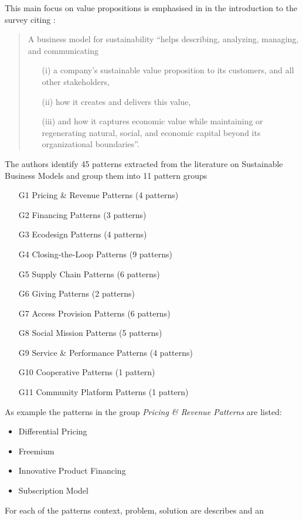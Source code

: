 \documentclass[11pt,a4paper]{article}
\begin{document}
This main focus on value propositions is emphasised in \cite{LF2018} in the
introduction to the survey citing \cite{Schaltegger2016}:
\begin{quote}
  A business model for sustainability “helps describing, analyzing, managing,
  and communicating
  \begin{itemize}
  \item[(i)] a company’s sustainable value proposition to its customers, and
    all other stakeholders,
  \item[(ii)] how it creates and delivers this value,
  \item[(iii)] and how it captures economic value while maintaining or
    regenerating natural, social, and economic capital beyond its
    organizational boundaries”.
  \end{itemize}
\end{quote}
The authors identify 45 patterns extracted from the literature on Sustainable
Business Models and group them into 11 pattern groups 
\begin{itemize}
\item[G1] Pricing \& Revenue Patterns (4 patterns)
\item[G2] Financing Patterns (3 patterns)
\item[G3] Ecodesign Patterns  (4 patterns)
\item[G4] Closing-the-Loop Patterns (9 patterns)
\item[G5] Supply Chain Patterns (6 patterns)
\item[G6] Giving Patterns (2 patterns)
\item[G7] Access Provision Patterns (6 patterns)
\item[G8] Social Mission Patterns (5 patterns)
\item[G9] Service \& Performance Patterns (4 patterns)
\item[G10] Cooperative Patterns (1 pattern)
\item[G11] Community Platform Patterns (1 pattern)
\end{itemize}
As example the patterns in the group \emph{Pricing \& Revenue Patterns} are
listed: 
\begin{itemize}
\item Differential Pricing
\item Freemium
\item Innovative Product Financing
\item Subscription Model
\end{itemize}
For each of the patterns context, problem, solution are describes and an
\end{document}
